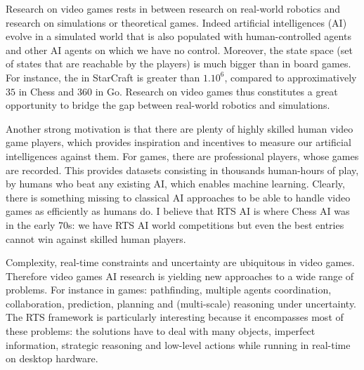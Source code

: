 Research on video games rests in between research on real-world robotics and research on simulations or theoretical games. Indeed artificial intelligences (AI) evolve in a simulated world that is also populated with human-controlled agents and other AI agents on which we have no control. 
Moreover, the state space (set of states that are reachable by the players) is much bigger than in board games. For instance, the  in StarCraft is greater than $1.10^6$, compared to approximatively $35$ in Chess and $360$ in Go. 
Research on video games thus constitutes a great opportunity to bridge the gap between real-world robotics and simulations.


Another strong motivation is that there are plenty of highly skilled human video game players, which provides inspiration and incentives to measure our artificial intelligences against them. For  games, there are professional players, whose games are recorded. This provides datasets consisting in thousands human-hours of play, by humans who beat any existing AI, which enables machine learning. Clearly, there is something missing to classical AI approaches to be able to handle video games as efficiently as humans do. I believe that RTS AI is where Chess AI was in the early 70s: we have RTS AI world competitions but even the best entries cannot win against skilled human players.


Complexity, real-time constraints and uncertainty are ubiquitous in video games. Therefore video games AI research is yielding new approaches to a wide range of problems. For instance in  games: pathfinding, multiple agents coordination, collaboration, prediction, planning and (multi-scale) reasoning under uncertainty. The RTS framework is particularly interesting because it encompasses most of these problems: the solutions have to deal with many objects, imperfect information, strategic reasoning and low-level actions while running in real-time on desktop hardware.

